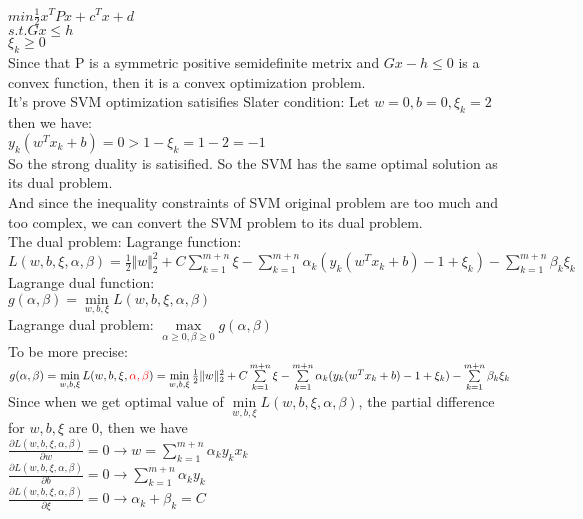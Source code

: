 \documentclass{article}
\begin{document}
\noindent $min \frac{1}{2}x^TPx + c^Tx + d$\\
$s.t. Gx \leq h$\\
$\xi_k \geq 0$\\

Since that P is a symmetric positive semidefinite metrix and $Gx-h \leq 0$ is a convex function,
then it is a convex optimization problem.\\
It's prove SVM optimization satisifies Slater condition: Let $w = 0, b = 0, \xi_k = 2$ then we have:\\
$y_k(w^Tx_k + b) = 0 > 1 - \xi_k = 1-2 = -1$\\
So the strong duality is satisified. So the SVM has the same optimal solution as its dual problem.\\
And since the inequality constraints of SVM original problem are too much and too complex, we can convert 
the SVM problem to  its dual problem.\\
The dual problem:
Lagrange function: \\
$L(w,b,\xi,\alpha,\beta) = \frac{1}{2}\Vert w \Vert_2^2 + C \sum\limits_{k=1}^{m+n}\xi - \sum\limits_{k=1}^{m+n}\alpha_k(y_k(w^Tx_k + b) - 1 + \xi_k) - \sum\limits_{k=1}^{m+n}\beta_k\xi_k$\\
Lagrange dual function:\\
$g(\alpha,\beta) = \min\limits_{w,b,\xi}L(w,b,\xi,\alpha,\beta)$\\
Lagrange dual problem: $\max\limits_{\alpha \geq 0, \beta \geq 0}g(\alpha,\beta)$\\
To be more precise:\\
$g(\alpha,\beta) = \min\limits_{w,b,\xi}L(w,b,\xi,\textcolor{red}{\alpha,\beta}) = \min\limits_{w,b,\xi} \frac{1}{2}\Vert w \Vert_2^2 + C \sum\limits_{k=1}^{m+n}\xi - \sum\limits_{k=1}^{m+n}\alpha_k(y_k(w^Tx_k + b) - 1 + \xi_k) - \sum\limits_{k=1}^{m+n}\beta_k\xi_k$\\
Since when we get optimal value of $\min\limits_{w,b,\xi}L(w,b,\xi,\alpha,\beta)$, the partial difference for $w,b,\xi$ are 0, then we have\\
$\frac{\partial L(w,b,\xi,\alpha,\beta)}{\partial w} =0 \rightarrow w = \sum\limits_{k=1}^{m+n}\alpha_k y_k x_k$\\
$\frac{\partial L(w,b,\xi,\alpha,\beta)}{\partial b} =0 \rightarrow \sum\limits_{k=1}^{m+n}\alpha_k y_k$\\
$\frac{\partial L(w,b,\xi,\alpha,\beta)}{\partial \xi} =0 \rightarrow \alpha_k + \beta_k = C$\\
\end{document}
